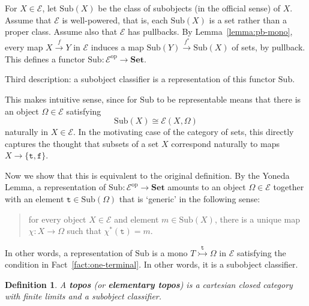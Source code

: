 \documentclass[12pt]{article}
\newcommand{\cat}[1]{\mathscr{#1}}
\newcommand{\fcat}[1]{\mathbf{#1}}
\newcommand{\op}{\mathrm{op}}
\newcommand{\Set}{\fcat{Set}}
\newcommand{\demph}[1]{\textbf{\textup{#1}}}
\newcommand{\iso}{\cong}
\newcommand{\tr}{\texttt{t}}
\newcommand{\fa}{\texttt{f}}
\newcommand{\E}{\cat{E}}
\newcommand{\Sub}{\mathrm{Sub}}
\newcommand{\toby}[1]{\stackrel{#1}{\to}}
\newcommand{\monic}{\rightarrowtail}
\newcommand{\monicby}[1]{\stackrel{#1}{\monic}}
\newcommand{\cln}{\colon}
\newtheorem{predefn}[thm]{Definition}
\newenvironment{defn}{\begin{predefn}\upshape}{\end{predefn}}
\begin{document}
For $X \in \E$, let $\Sub(X)$ be the class of subobjects (in the official
sense) of $X$.  Assume that $\E$ is well-powered, that is, each $\Sub(X)$ is a
set rather than a proper class.  Assume also that $\E$ has pullbacks.  By
Lemma~\ref{lemma:pb-mono}, every map $X \toby{f} Y$ in $\E$ induces a map
$\Sub(Y) \toby{f^*} \Sub(X)$ of sets, by pullback.  This defines a functor
$\Sub\cln \E^\op \to \Set$.

Third description: a subobject classifier is a representation of this functor
$\Sub$.

This makes intuitive sense, since for $\Sub$ to be representable means that
there is an object $\Omega \in \E$ satisfying
\[
\Sub(X) \iso \E(X, \Omega)
\]
naturally in $X \in \E$.  In the motivating case of the category of sets, this
directly captures the thought that subsets of a set $X$ correspond naturally
to maps $X \to \{\tr, \fa\}$.  

Now we show that this is equivalent to the original definition.  By the Yoneda
Lemma, a representation of $\Sub\cln \E^\op \to \Set$ amounts to an object
$\Omega \in \E$ together with an element $\tr \in \Sub(\Omega)$ that is
`generic' in the following sense:
% 
\begin{quote}
for every object $X \in \E$ and element $m \in \Sub(X)$, there is a unique map
$\chi\cln X \to \Omega$ such that $\chi^*(\tr) = m$.
\end{quote}
% 
In other words, a representation of $\Sub$ is a mono $T \monicby{\tr} \Omega$
in $\E$ satisfying the condition in Fact~\ref{fact:one-terminal}.  In other
words, it is a subobject classifier.

\begin{defn}
A \demph{topos} (or \demph{elementary topos}) is a cartesian closed category
with finite limits and a subobject classifier.
\end{defn}
\end{document}
